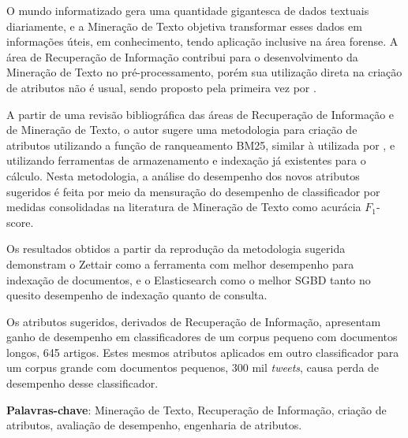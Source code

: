 \setlength{\absparsep}{18pt} %
\begin{resumo}
    
    O mundo informatizado gera uma quantidade gigantesca de dados textuais diariamente, e a Mineração de Texto objetiva transformar esses dados em informações úteis, em conhecimento, tendo aplicação inclusive na área forense.
    A área de Recuperação de Informação contribui para o desenvolvimento da Mineração de Texto no pré-processamento, porém sua utilização direta na criação de atributos não é usual, sendo proposto pela primeira vez por .
    
    A partir de uma revisão bibliográfica das áreas de Recuperação de Informação e de Mineração de Texto, o autor sugere uma metodologia para criação de atributos utilizando a função de ranqueamento BM25, similar à utilizada por , e utilizando ferramentas de armazenamento e indexação já existentes para o cálculo.
    Nesta metodologia, a análise do desempenho dos novos atributos sugeridos é feita por meio da mensuração do desempenho de classificador por medidas consolidadas na literatura de Mineração de Texto como acurácia $F_1$-score.

    Os resultados obtidos a partir da reprodução da metodologia sugerida demonstram o Zettair como a ferramenta com melhor desempenho para indexação de documentos, e o Elasticsearch como o melhor SGBD tanto no quesito desempenho de indexação quanto de consulta.

    Os atributos sugeridos, derivados de Recuperação de Informação, apresentam ganho de desempenho em classificadores de um corpus pequeno com documentos longos, 645 artigos.
    Estes mesmos atributos aplicados em outro classificador para um corpus grande com documentos pequenos, 300 mil \textit{tweets}, causa perda de desempenho desse classificador.
    
    \vspace{\onelineskip}
    
	\noindent
    \textbf{Palavras-chave}: Mineração de Texto, Recuperação de Informação, criação de atributos, avaliação de desempenho, engenharia de atributos.
    
\end{resumo}